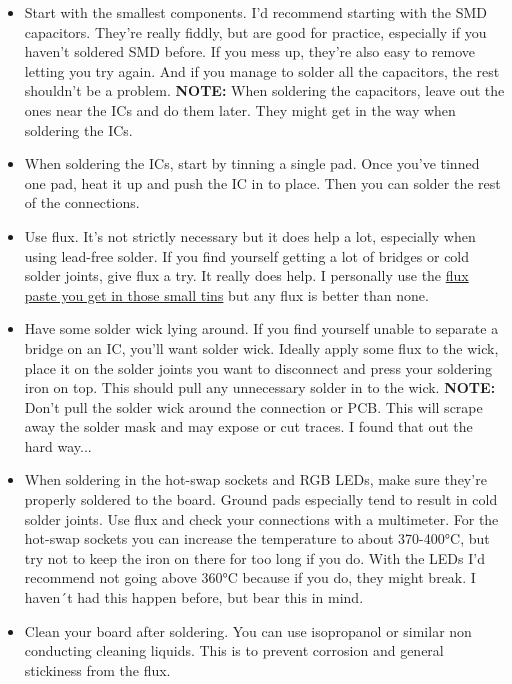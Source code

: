 \documentclass[english, 12pt]{scrartcl}
\begin{document}
	\begin{itemize}
		\item Start with the smallest components. I'd recommend starting with the SMD capacitors. They're really fiddly, but are good for practice, especially if you haven't soldered SMD before. If you mess up, they're also easy to remove letting you try again. And if you manage to solder all the capacitors, the rest shouldn't be a problem.\newline
		\textbf{NOTE:} When soldering the capacitors, leave out the ones near the ICs and do them later. They might get in the way when soldering the ICs.
		\item When soldering the ICs, start by tinning a single pad. Once you've tinned one pad, heat it up and push the IC in to place. Then you can solder the rest of the connections.
		\item Use flux. It's not strictly necessary but it does help a lot, especially when using lead-free solder. If you find yourself getting a lot of bridges or cold solder joints, give flux a try. It really does help. I personally use the \href{https://www.amazon.de/FELDER-L%C3%B6tfett-L%C3%B6tmittel-Solder-L%C3%B6tpaste/dp/B01822CUO6}{flux paste you get in those small tins} but any flux is better than none.
		\item Have some solder wick lying around. If you find yourself unable to separate a bridge on an IC, you'll want solder wick. Ideally apply some flux to the wick, place it on the solder joints you want to disconnect and press your soldering iron on top. This should pull any unnecessary solder in to the wick.\newline
		\textbf{NOTE:} Don't pull the solder wick around the connection or PCB. This will scrape away the solder mask and may expose or cut traces. I found that out the hard way...
		\item When soldering in the hot-swap sockets and RGB LEDs, make sure they're properly soldered to the board. Ground pads especially tend to result in cold solder joints. Use flux and check your connections with a multimeter. For the hot-swap sockets you can increase the temperature to about 370-400°C, but try not to keep the iron on there for too long if you do. With the LEDs I'd recommend not going above 360°C because if you do, they might break. I haven´t had this happen before, but bear this in mind.
		\item Clean your board after soldering. You can use isopropanol or similar non conducting cleaning liquids. This is to prevent corrosion and general stickiness from the flux.
	\end{itemize}
	
\end{document}
